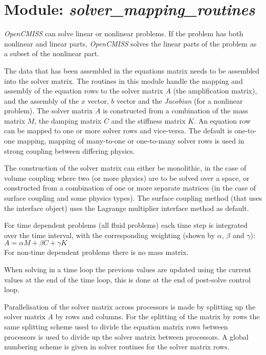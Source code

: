 \section{Module: \emph{solver\_mapping\_routines}}
\label{sec:solvermappingroutines}

\emph{OpenCMISS} can solve linear or nonlinear problems. If the problem has 
both nonlinear and linear parts, \emph{OpenCMISS} solves the linear parts 
of the problem as a subset of the nonlinear part.

The data that has been assembled in the equations matrix needs to be assembled 
into the solver matrix. The routines in this module handle the mapping and 
assembly of the equation rows to the solver matrix $A$ (the amplification 
matrix), and the assembly of the $x$ vector, $b$ vector and the \emph{Jacobian} 
(for a nonlinear problem). The solver matrix $A$ is constructed from a 
combination of the mass matrix $M$, the damping matrix $C$ and the stiffness 
matrix $K$. An equation row can be mapped to one or more solver rows and 
vice-versa. The default is one-to-one mapping, mapping of many-to-one or 
one-to-many solver rows is used in strong coupling between differing physics.

The construction of the solver matrix can either be monolithic, in the case of
volume coupling where two (or more physics) are to be solved over a space, or
constructed from a combination of one or more separate matrices (in the case of
surface coupling and some physics types). The surface coupling method (that
uses the interface object) uses the Lagrange multiplier interface method as 
default.

For time dependent problems (all fluid problems) each time step is integrated 
over the time interval, with the corresponding weighting (shown by $\alpha$, 
$\beta$ and $\gamma$): $A=\alpha M + \beta C+ \gamma K$ \\
For non-time dependent problems there is no mass matrix.

When solving in a time loop the previous values are updated using the current
values at the end of the time loop, this is done at the end of post-solve
control loop.

Parallelisation of the solver matrix across processors is made by splitting up
the solver matrix $A$ by rows and columns. For the splitting of the matrix by
rows the same splitting scheme used to divide the equation matrix rows between
processors is used to divide up the solver matrix between processors. A global
numbering scheme is given in solver routines for the solver matrix rows.

